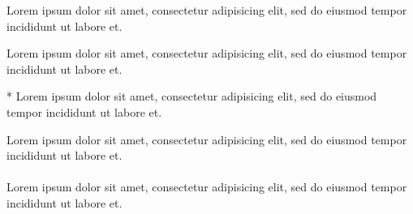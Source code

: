 \documentclass{article}
\begin{document}

\clozereset

\begin{clozebox}[boxwidth=5cm]
Lorem ipsum dolor sit amet, consectetur adipisicing elit, sed do eiusmod
tempor incididunt ut labore et.
\end{clozebox}


\clozereset

\begin{clozebox}[boxwidth=5cm,boxheight=5cm]
Lorem ipsum dolor sit amet, consectetur adipisicing elit, sed do eiusmod
tempor incididunt ut labore et.
\end{clozebox}


\begin{clozebox}*
Lorem ipsum dolor sit amet, consectetur adipisicing elit, sed do eiusmod
tempor incididunt ut labore et.
\end{clozebox}


\begin{clozebox}
\noindent
Lorem ipsum dolor sit amet, consectetur adipisicing elit, sed do eiusmod
tempor incididunt ut labore et.\\\\
%
Lorem ipsum dolor sit amet, consectetur adipisicing elit, sed do eiusmod
tempor incididunt ut labore et.
\end{clozebox}
\end{document}
